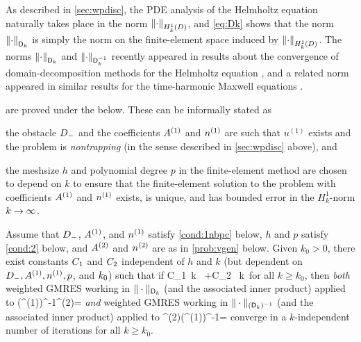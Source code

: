 As described in \cref{sec:wpdisc}, the PDE analysis of the Helmholtz equation naturally takes place in the norm $\NHokD{\cdot}$, and \cref{eq:Dk} shows that the norm $\NDmatk{\cdot}$ is simply the norm on the finite-element space induced by  $\NHokD{\cdot}$. %
The norms $\NDmatk{\cdot}$ and $\NDmatkI{\cdot}$ recently appeared in results about the convergence of domain-decomposition methods %
for the Helmholtz equation \cite{GrSpVa:17,GrSpZo:18}, and a related norm appeared in similar results for the time-harmonic Maxwell equations \cite{BoDoGrSpTo:19}. 

 are proved under the  below. These  can be informally stated as 
\bit
\item the obstacle $D_{-}$ and the coefficients ${A}^{(1)}$ and ${n}^{(1)}$ are such that $u^{(1)}$ exists and the problem is \emph{nontrapping} (in the sense described in  \cref{sec:wpdisc} above), and
\item the meshsize $h$ and polynomial degree $p$ in the finite-element method are chosen to depend on $k$ to ensure that the 
finite-element solution to the problem with coefficients ${A}^{(1)}$ and ${n}^{(1)}$ exists, is unique, and has bounded error in the $H^1_k$-norm
$k\rightarrow \infty$. 
\eit 





\label{cor:1}
Assume that $D_{-}$, ${A}^{(1)}$, and ${n}^{(1)}$ satisfy \cref{cond:1nbpc} below, $h$ and $p$ satisfy \cref{cond:2} below, and ${A}^{(2)}$ and ${n}^{(2)}$ are as in \cref{prob:vgen} below. Given $k_0>0$, there exist constants $C_{1}$ and $C_{2}$  independent of $h$ and $k$ (but dependent on $D_{-}, {A}^{(1)}, {n}^{(1)}, p$, and $k_{0}$) such that if 
\beq\label{eq:cond}
C_1 \,k \,\NLiDRRdtd{\Aso-\Ast} +C_2 \, k\, \NLiDRR{\nso-\nst}
\leq {}
\eeq
for all $k\geq k_0$, then \emph{both} weighted GMRES working in $\|\cdot\|_{\mathsf{D}_k}$ (and the associated inner product) applied to 
\beq\label{eq:pcsystem1}
(\Amat^{(1)})^{-1}\Amat^{(2)}\uvec = \fvec
\eeq
\emph{and} weighted GMRES working in $\|\cdot\|_{(\mathsf{D}_k)^{-1}}$ (and the associated inner product) applied to 
\beq\label{eq:pcsystem2}
\Amat^{(2)}(\Amat^{(1)})^{-1}\vvec = \fvec
\eeq
 converge in a $k$-independent number of iterations for all $k\geq k_0$.
 \enth

